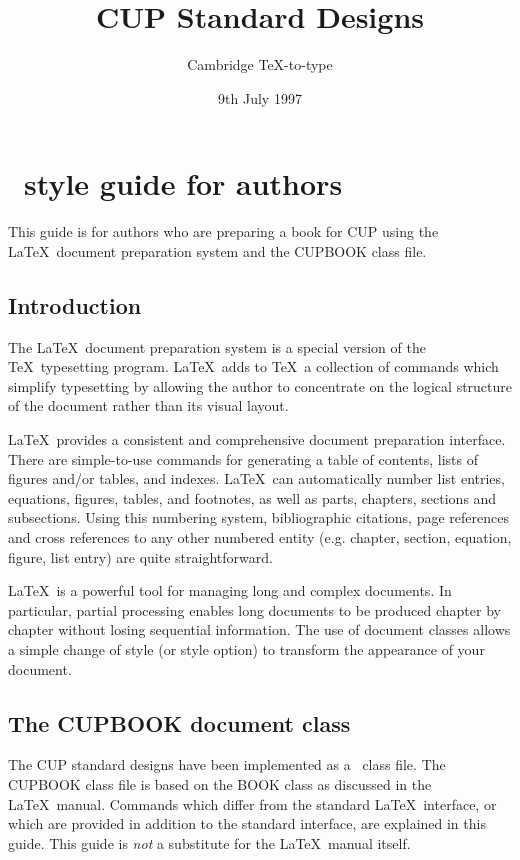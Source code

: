 \documentclass[cup6a]{cupbook}
\title[ \LaTeXe\ Style Guide for Authors]
      {CUP Standard Designs}
\author{Cambridge \TeX-to-type}
\date{9th July 1997}
\begin{document}
\maketitle
\tableofcontents
\cleardoublepage
{}

\chapter{\LaTeXe\ style guide for authors}

This guide is for authors who are preparing a book for CUP using the
\LaTeX\ document preparation system and the CUPBOOK class file.

\section{Introduction}

The \LaTeX\ document preparation system is a special version of the
\TeX\ typesetting program.
 \LaTeX\ adds to \TeX\ a collection of commands which simplify
typesetting by allowing the author to concentrate on the
logical structure of the document rather than its visual layout.

\LaTeX\ provides a consistent and comprehensive document preparation
interface.
 There are simple-to-use commands for generating a table of contents,
lists of figures and/or tables, and indexes.
 \LaTeX\ can automatically number list entries, equations, figures,
tables, and footnotes, as well as parts, chapters, sections and
subsections.
 Using this numbering system, bibliographic citations, page references
and cross references to any other numbered entity (e.g. chapter,
section, equation, figure, list entry) are quite straightforward.

\LaTeX\ is a powerful tool for managing long and complex documents.
In particular, partial processing enables long documents to be
produced chapter by chapter without losing sequential information.
The use of document classes allows a simple change of style (or style
option) to transform the appearance of your document.

\section{The CUPBOOK document class}

The CUP standard designs have been implemented as a \LaTeXe\ class file.
The CUPBOOK class file is based on the BOOK class as discussed in the
\LaTeX\ manual.
 Commands which differ from the standard \LaTeX\ interface, or which
are provided in addition to the standard interface, are explained in
this guide.
 This guide is \emph{not} a substitute for the \LaTeX\ manual itself.
\end{document}
